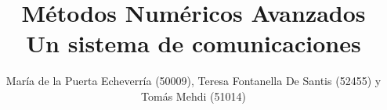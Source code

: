 \documentclass[10pt,journal,compsoc]{IEEEtran}
\begin{document}
%
\title{M\'etodos Num\'ericos Avanzados\\  Un sistema de comunicaciones }
%
%
%
%

\author{Mar\'ia de la Puerta Echeverr\'ia (50009),
       Teresa Fontanella De Santis (52455) y
	Tom\'as Mehdi (51014)
	\\~
	
}
\end{document}
